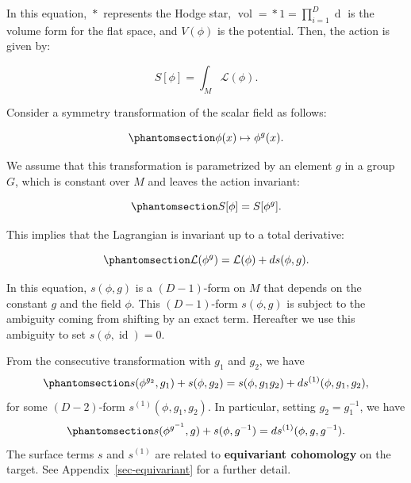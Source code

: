 \documentclass[
  letterpaper,
  DIV=11,
  numbers=noendperiod]{scrreport}
\DeclareMathOperator{\vol}{vol}
\DeclareMathOperator{\id}{id}
\newcommand{\stdim}{D}
\begin{document}
In this equation, \(\mathop{*}\) represents the Hodge star,
\(\vol = \mathop{*} 1 = \prod_{i=1}^{\stdim} \mathop{dx_i}\) is the
volume form for the flat space, and \(V(\phi)\) is the potential. Then,
the action is given by:

\[
S[\phi] = \int_{M}\mathcal{L}(\phi).
\]

Consider a symmetry transformation of the scalar field as follows:

\begin{equation}\phantomsection\label{eq-scalar-transf}{
\phi(x) \mapsto \phi^g(x).
}\end{equation}

We assume that this transformation is parametrized by an element \(g\)
in a group \(G\), which is constant over \(M\) and leaves the action
invariant:

\begin{equation}\phantomsection\label{eq-action-inv}{
S[\phi]=S[\phi^g].
}\end{equation}

This implies that the Lagrangian is invariant up to a total derivative:

\begin{equation}\phantomsection\label{eq-Lagrangian-inv}{
\mathcal{L}(\phi^g) = \mathcal{L}(\phi) + \mathop{ds}(\phi,g).
}\end{equation}

In this equation, \(s(\phi,g)\) is a \((\stdim-1)\)-form on \(M\) that
depends on the constant \(g\) and the field \(\phi\). This
\((D-1)\)-form \(s(\phi,g)\) is subject to the ambiguity coming from
shifting by an exact term. Hereafter we use this ambiguity to set
\(s(\phi,\id)=0\).

From the consecutive transformation with \(g_1\) and \(g_2\), we have
\begin{equation}\phantomsection\label{eq-surface-term-assosiative}{ 
s(\phi^{g_2},g_1) + s(\phi,g_2) = s(\phi,g_1g_2) + ds^{(1)}(\phi,g_1,g_2),
}\end{equation} for some \((D-2)\)-form \(s^{(1)}(\phi,g_1,g_2)\). In
particular, setting \(g_2=g_1^{-1}\), we have
\begin{equation}\phantomsection\label{eq-surface-term-inverse}{s(\phi^{g^{-1}},g) + s(\phi,g^{-1})  = ds^{(1)}(\phi, g, g^{-1}).
}\end{equation} The surface terms \(s\) and \(s^{(1)}\) are related to
\textbf{equivariant cohomology} on the target. See
Appendix~\ref{sec-equivariant} for a further detail.
\end{document}
